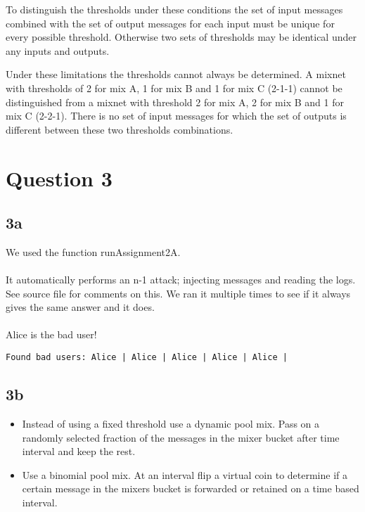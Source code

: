 \documentclass[a4paper,11pt]{article}
\begin{document}
To distinguish the thresholds under these conditions the set of input messages combined with the set of output messages for each input must be unique for every possible threshold. Otherwise two sets of thresholds may be identical under any inputs and outputs.

Under these limitations the thresholds cannot always be determined. A mixnet with thresholds of 2 for mix A, 1 for mix B and 1 for mix C (2-1-1) cannot be distinguished from a mixnet with threshold 2 for mix A, 2 for mix B and 1 for mix C (2-2-1). There is no set of input messages for which the set of outputs is different between these two thresholds combinations.

\section{Question 3}
\subsection{3a}
We used the function runAssignment2A. 
\paragraph{}It automatically performs an n-1 attack; injecting messages and reading the logs. See source file for comments on this.
We ran it multiple times to see if it always gives the same answer and it does. 
\paragraph{}Alice is the bad user!
\begin{lstlisting}
Found bad users: Alice | Alice | Alice | Alice | Alice | 
\end{lstlisting}


\subsection{3b}
\begin{itemize}
 \item Instead of using a fixed threshold use a dynamic pool mix. Pass on a randomly selected fraction of the messages in the mixer bucket after time interval and keep the rest.
 \item Use a binomial pool mix. At an interval flip a virtual coin to determine if a certain message in the mixers bucket is forwarded or retained on a time based interval.
\end{itemize}
\end{document}
